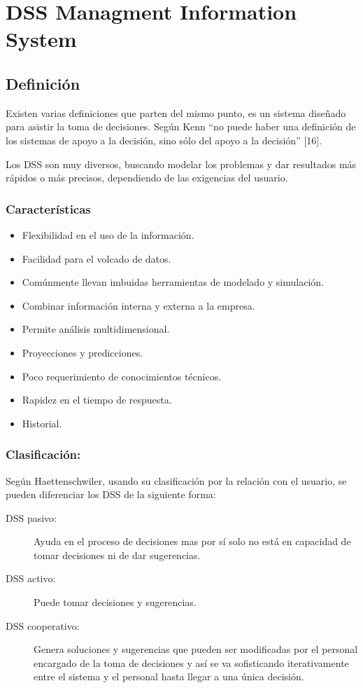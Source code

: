 \chapter[DSS]{DSS Managment Information System}
\section {Definición}
Existen varias definiciones que parten del mismo punto, es un sistema diseñado para asistir la toma de decisiones. Según Kenn “no puede haber una definición de los sistemas de apoyo a la decisión, sino sólo del apoyo a la decisión” [16].

Los DSS son muy diversos, buscando modelar los problemas y dar resultados más rápidos o más precisos, dependiendo de las exigencias del usuario.

\subsection{Características}
\begin{itemize}
\item Flexibilidad en el uso de la información.
\item Facilidad para el volcado de datos.
\item Comúnmente llevan imbuidas herramientas de modelado y simulación.
\item Combinar información interna y externa a la empresa.
\item Permite análisis multidimensional.
\item Proyecciones y predicciones.
\item Poco requerimiento de conocimientos técnicos.
\item Rapidez en el tiempo de respuesta.
\item Historial.
\end{itemize}

\subsection {Clasificación:}

Según Haettenschwiler, usando su clasificación por la relación con el usuario, se pueden diferenciar los DSS de la siguiente forma:
\begin{description}
\item [DSS pasivo:] Ayuda en el proceso de decisiones mas por sí solo no está en capacidad de tomar decisiones ni de dar sugerencias.
\item [DSS activo:] Puede tomar decisiones y sugerencias.
\item [DSS cooperativo:] Genera soluciones y sugerencias que pueden ser modificadas por el personal encargado de la toma de decisiones y así se va sofisticando iterativamente entre el sistema y el personal hasta llegar a una única decisión.
\end{description}

